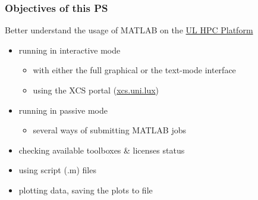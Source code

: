 \documentclass{beamer}
\newcommand{\ULHPC}{\href{http://hpc.uni.lu}{UL HPC Platform}\xspace}
\begin{document}
\begin{frame}
  \frametitle{Objectives of this PS}

  Better understand the usage of MATLAB on the \ULHPC
 
  \begin{exampleblock}{}
    \begin{itemize}
      \item running in interactive mode
      \begin{itemize}
        \item with either the full graphical or the text-mode interface
        \item using the XCS portal (\href{https://xcs.uni.lux}{xcs.uni.lux})
      \end{itemize}
     \end{itemize}
     \vspace{-1.5ex}
   \end{exampleblock}
   \pause
   \begin{exampleblock}{}
    \begin{itemize}
     \item running in passive mode
      \begin{itemize}
       \item several ways of submitting MATLAB jobs
      \end{itemize}
     \end{itemize}
    \vspace{-1.5ex}
    \end{exampleblock}
   \pause
   \begin{exampleblock}{}
    \begin{itemize}
     \item checking available toolboxes \& licenses status
    \end{itemize}
   \vspace{-1.5ex}
   \end{exampleblock}
   \pause
   \begin{exampleblock}{}
    \begin{itemize}
     \item using script (.m) files
    \end{itemize}
   \vspace{-1.5ex}
   \end{exampleblock}
   \pause
   \begin{exampleblock}{}
    \begin{itemize}
     \item plotting data, saving the plots to file
    \end{itemize}
    \vspace{-1.5ex}
   \end{exampleblock}
\end{frame}
\end{document}
